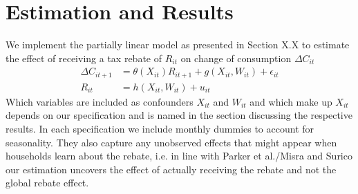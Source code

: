 \section{Estimation and Results} \label{sec:estim_res}
We implement the partially linear model as presented in Section X.X to estimate the effect of receiving a tax rebate of $R_{it}$ on change of consumption $\Delta C_{it}$
\begin{align}
    \Delta C_{it+1}&=\theta(X_{it})R_{it+1}+g(X_{it}, W_{it})+\epsilon_{it} \label{eq:plm_C1}\\
    R_{it}&=h(X_{it}, W_{it})+u_{it} \label{eq:plm_C2}
\end{align}
Which variables are included as confounders $X_{it}$ and $W_{it}$ and which make up $X_{it}$ depends on our specification and is named in the section discussing the respective results. In each specification we include monthly dummies to account for seasonality. They also capture any unobserved effects that might appear when households learn about the rebate, i.e. in line with Parker et al./Misra and Surico our estimation uncovers the effect of actually receiving the rebate and not the global rebate effect.


